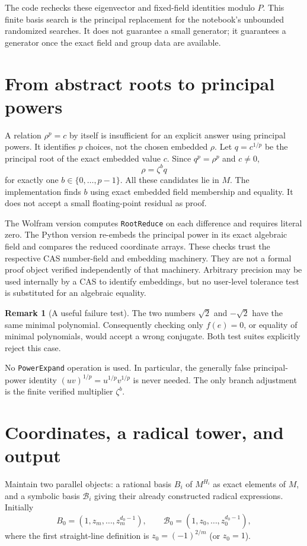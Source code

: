 \documentclass[11pt,a4paper]{article}
\newcommand{\code}[1]{\texttt{\small #1}}
\theoremstyle{definition}
\newtheorem{remark}[theorem]{Remark}
\begin{document}
The code rechecks these eigenvector and fixed-field identities modulo $P$.
This finite basis search is the principal replacement for the notebook's
unbounded randomized searches. It does not guarantee a small generator; it
guarantees a generator once the exact field and group data are available.

\section{From abstract roots to principal powers}
A relation $\rho^p=c$ by itself is insufficient for an explicit answer using
principal powers. It identifies $p$ choices, not the chosen embedded $\rho$.
Let $q=c^{1/p}$ be the principal root of the exact embedded value $c$. Since
$q^p=\rho^p$ and $c\ne0$,
\[
 \rho=\zeta^b q
\]
for exactly one $b\in\{0,\ldots,p-1\}$. All these candidates lie in $M$.
The implementation finds $b$ using exact embedded field membership and equality.
It does not accept a small floating-point residual as proof.

The Wolfram version computes \code{RootReduce} on each difference and requires
literal zero. The Python version re-embeds the principal power in its exact
algebraic field and compares the reduced coordinate arrays. These checks trust
the respective CAS number-field and embedding machinery. They are not a
formal proof object verified independently of that machinery. Arbitrary
precision may be used internally by a CAS to identify embeddings, but no
user-level tolerance test is substituted for an algebraic equality.

\begin{remark}[A useful failure test]
The two numbers $\sqrt2$ and $-\sqrt2$ have the same minimal polynomial.
Consequently checking only $f(e)=0$, or equality of minimal polynomials,
would accept a wrong conjugate. Both test suites explicitly reject this case.
\end{remark}

No \code{PowerExpand} operation is used. In particular, the generally false
principal-power identity $(uv)^{1/p}=u^{1/p}v^{1/p}$ is never needed. The only
branch adjustment is the finite verified multiplier $\zeta^b$.

\section{Coordinates, a radical tower, and output}\label{sec:tower}
Maintain two parallel objects: a rational basis $B_i$ of $M^{H_i}$ as exact
elements of $M$, and a symbolic basis $\mathcal B_i$ giving their already
constructed radical expressions. Initially
\[
 B_0=(1,z_m,\ldots,z_m^{d_0-1}),\qquad
 \mathcal B_0=(1,z_0,\ldots,z_0^{d_0-1}),
\]
where the first straight-line definition is $z_0=(-1)^{2/m}$ (or $z_0=1$).
\end{document}
